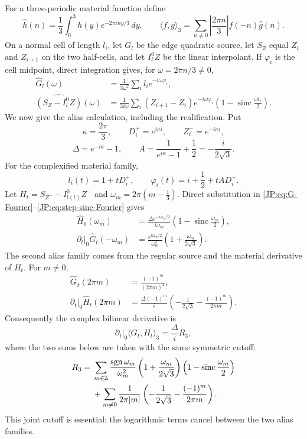 \iffalse
For a three-periodic material function define
\[
 \widehat h(n)=\frac13\int_0^3h(y)e^{-2\pi iny/3}\,dy,
 \qquad
 \langle f,g\rangle_3
 =\sum_{n\ne0}\left|\frac{2\pi n}{3}\right|
       \widehat f(-n)\widehat g(n).
\]
On a normal cell of length $l_i$, let $G_l$ be the edge quadratic
source, let $S_Z$ equal $Z_i$ and $Z_{i+1}$ on the two half-cells, and let
$I_l^0Z$ be the linear interpolant.  If $\varphi_i$ is the cell midpoint,
direct integration gives, for $\omega=2\pi n/3\ne0$,
\begin{align}
 \widehat G_l(\omega)
 &=\frac1{3\omega^2}\sum_i l_i e^{-i\omega\varphi_i},\label{JP:eq:G-Fourier}\\
 \widehat{(S_Z-I_l^0Z)}(\omega)
 &=\frac1{3i\omega}\sum_i(Z_{i+1}-Z_i)e^{-i\omega\varphi_i}
 \left(1-\operatorname{sinc}\frac{\omega l_i}{2}\right).
 \label{JP:eq:step-sine-Fourier}
\end{align}
We now give the alias calculation, including the realification.  Put
\[
 \kappa=\frac{2\pi}{3},\qquad
 D_i^+=e^{i\kappa i},\qquad Z_i^-=e^{-i\kappa i},
\]
\[
 \Delta=e^{-i\kappa}-1,\qquad
 A=\frac1{e^{i\kappa}-1}+\frac12=-\frac{i}{2\sqrt3}.
\]
For the complexified material family,
\[
 l_i(t)=1+tD_i^+,\qquad
 \varphi_i(t)=i+\frac12+tAD_i^+.
\]
Let $H_t=S_{Z^-}-I_{l(t)}^0Z^-$ and
$\omega_m=2\pi(m-\frac13)$.  Direct substitution in
\eqref{JP:eq:G-Fourier}--\eqref{JP:eq:step-sine-Fourier} gives
\begin{align}
 \widehat H_0(\omega_m)
 &=\frac{\Delta e^{-i\omega_m/2}}{i\omega_m}
 \left(1-\operatorname{sinc}\frac{\omega_m}{2}\right),
 \label{JP:eq:R3-H-first}\\
 \left.\partial_t\right|_0\widehat G_t(-\omega_m)
 &=\frac{e^{i\omega_m/2}}{\omega_m^2}
 \left(1+\frac{\omega_m}{2\sqrt3}\right).
 \label{JP:eq:R3-G-first}
\end{align}
The second alias family comes from the regular source and the material
derivative of $H_t$.  For $m\ne0$,
\begin{align}
 \widehat G_0(2\pi m)&=\frac{(-1)^m}{(2\pi m)^2},
 \label{JP:eq:R3-G-second}\\
 \left.\partial_t\right|_0\widehat H_t(2\pi m)
 &=\frac{\Delta(-1)^m}{i}
 \left(-\frac1{2\sqrt3}-\frac{(-1)^m}{2\pi m}\right).
 \label{JP:eq:R3-H-second}
\end{align}
Consequently the complex bilinear derivative is
\begin{equation}\label{JP:eq:R3-alias-complex}
 \left.\partial_t\right|_0\langle G_t,H_t\rangle_3
 =\frac{\Delta}{i}R_3,
\end{equation}
where the two sums below are taken with the same symmetric cutoff:
\begin{align}
 R_3={}&
 \sum_{m\in\mathbb Z}
 \frac{\operatorname {sgn}\omega_m}{\omega_m^2}
 \left(1+\frac{\omega_m}{2\sqrt3}\right)
 \left(1-\operatorname{sinc}\frac{\omega_m}{2}\right)
 \notag\\
 &+\sum_{m\ne0}\frac1{2\pi|m|}
 \left(-\frac1{2\sqrt3}-\frac{(-1)^m}{2\pi m}\right).
 \label{JP:eq:R3-alias-sum}
\end{align}
This joint cutoff is essential: the logarithmic terms cancel between the
two alias families.

